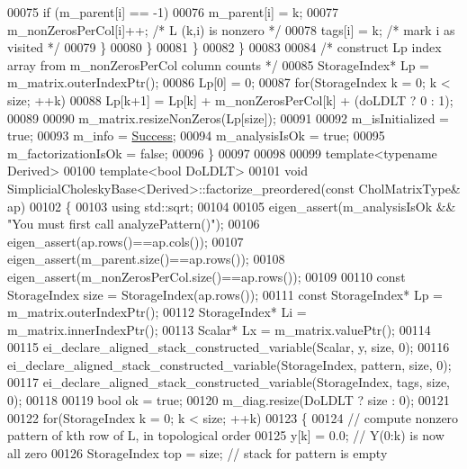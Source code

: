 \begin{DoxyCode}
00075           \textcolor{keywordflow}{if} (m\_parent[i] == -1)
00076             m\_parent[i] = k;
00077           m\_nonZerosPerCol[i]++;        \textcolor{comment}{/* L (k,i) is nonzero */}
00078           tags[i] = k;                  \textcolor{comment}{/* mark i as visited */}
00079         \}
00080       \}
00081     \}
00082   \}
00083 
00084   \textcolor{comment}{/* construct Lp index array from m\_nonZerosPerCol column counts */}
00085   StorageIndex* Lp = m\_matrix.outerIndexPtr();
00086   Lp[0] = 0;
00087   \textcolor{keywordflow}{for}(StorageIndex k = 0; k < size; ++k)
00088     Lp[k+1] = Lp[k] + m\_nonZerosPerCol[k] + (doLDLT ? 0 : 1);
00089 
00090   m\_matrix.resizeNonZeros(Lp[size]);
00091 
00092   m\_isInitialized     = \textcolor{keyword}{true};
00093   m\_info              = \hyperlink{group__enums_gga85fad7b87587764e5cf6b513a9e0ee5ea52581b035f4b59c203b8ff999ef5fcea}{Success};
00094   m\_analysisIsOk      = \textcolor{keyword}{true};
00095   m\_factorizationIsOk = \textcolor{keyword}{false};
00096 \}
00097 
00098 
00099 \textcolor{keyword}{template}<\textcolor{keyword}{typename} Derived>
00100 \textcolor{keyword}{template}<\textcolor{keywordtype}{bool} DoLDLT>
00101 \textcolor{keywordtype}{void} SimplicialCholeskyBase<Derived>::factorize\_preordered(\textcolor{keyword}{const} CholMatrixType& ap)
00102 \{
00103   \textcolor{keyword}{using} std::sqrt;
00104 
00105   eigen\_assert(m\_analysisIsOk && \textcolor{stringliteral}{"You must first call analyzePattern()"});
00106   eigen\_assert(ap.rows()==ap.cols());
00107   eigen\_assert(m\_parent.size()==ap.rows());
00108   eigen\_assert(m\_nonZerosPerCol.size()==ap.rows());
00109 
00110   \textcolor{keyword}{const} StorageIndex size = StorageIndex(ap.rows());
00111   \textcolor{keyword}{const} StorageIndex* Lp = m\_matrix.outerIndexPtr();
00112   StorageIndex* Li = m\_matrix.innerIndexPtr();
00113   Scalar* Lx = m\_matrix.valuePtr();
00114 
00115   ei\_declare\_aligned\_stack\_constructed\_variable(Scalar, y, size, 0);
00116   ei\_declare\_aligned\_stack\_constructed\_variable(StorageIndex,  pattern, size, 0);
00117   ei\_declare\_aligned\_stack\_constructed\_variable(StorageIndex,  tags, size, 0);
00118 
00119   \textcolor{keywordtype}{bool} ok = \textcolor{keyword}{true};
00120   m\_diag.resize(DoLDLT ? size : 0);
00121 
00122   \textcolor{keywordflow}{for}(StorageIndex k = 0; k < size; ++k)
00123   \{
00124     \textcolor{comment}{// compute nonzero pattern of kth row of L, in topological order}
00125     y[k] = 0.0;                     \textcolor{comment}{// Y(0:k) is now all zero}
00126     StorageIndex top = size;               \textcolor{comment}{// stack for pattern is empty}

\end{DoxyCode}
